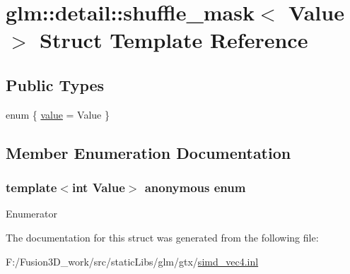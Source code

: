 \hypertarget{structglm_1_1detail_1_1shuffle__mask}{}\section{glm\+:\+:detail\+:\+:shuffle\+\_\+mask$<$ Value $>$ Struct Template Reference}
\label{structglm_1_1detail_1_1shuffle__mask}
\subsection*{Public Types}
\begin{DoxyCompactItemize}
\item 
enum \{ \hyperlink{structglm_1_1detail_1_1shuffle__mask_a847258aaac7f4a2d8f5057bc05bc7496ab8f2a8116a15411fc6158a86bf6be26d}{value} = Value
 \}
\end{DoxyCompactItemize}


\subsection{Member Enumeration Documentation}
\hypertarget{structglm_1_1detail_1_1shuffle__mask_a847258aaac7f4a2d8f5057bc05bc7496}{}\subsubsection[{anonymous enum}]{\setlength{\rightskip}{0pt plus 5cm}template$<$int Value$>$ anonymous enum}\label{structglm_1_1detail_1_1shuffle__mask_a847258aaac7f4a2d8f5057bc05bc7496}
\begin{Desc}
\item[Enumerator]\par
\begin{description}
\item[{\em 
\hypertarget{structglm_1_1detail_1_1shuffle__mask_a847258aaac7f4a2d8f5057bc05bc7496ab8f2a8116a15411fc6158a86bf6be26d}{}value\label{structglm_1_1detail_1_1shuffle__mask_a847258aaac7f4a2d8f5057bc05bc7496ab8f2a8116a15411fc6158a86bf6be26d}
}]\end{description}
\end{Desc}


The documentation for this struct was generated from the following file\+:\begin{DoxyCompactItemize}
\item 
F\+:/\+Fusion3\+D\+\_\+work/src/static\+Libs/glm/gtx/\hyperlink{simd__vec4_8inl}{simd\+\_\+vec4.\+inl}\end{DoxyCompactItemize}
